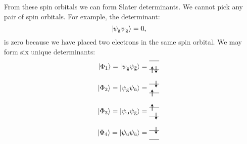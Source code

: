 \documentclass[../Main/chem532-notes.tex]{subfiles}
\begin{document}
From these spin orbitals we can form Slater determinants.
We cannot pick any pair of spin orbitals.
For example, the determinant:
\begin{equation}
\ket{\psi_{\mathrm{g}}\psi_{\mathrm{g}}} = 0,
\end{equation}
is zero because we have placed two electrons in the same spin orbital.
We may form six unique determinants:
\begin{align}
\ket{\Phi_1} = \ket{\psi_{\mathrm{g}}\psi_{\bar{\mathrm{g}}}} 
=
  \begin{tikzpicture}[baseline={([yshift=-.5ex]current bounding box.center)},vertex/.style={anchor=base, minimum size=18pt, inner sep=2pt}]
    \draw (0,0.275) -- (0.5,0.275);
    \draw (0,0.725) -- (0.5,0.725);
    \draw[thick,->,>=stealth] (0.15,0.1) -- (0.15,0.45);
    \draw[thick,<-,>=stealth] (0.35,0.1) -- (0.35,0.45);
  \end{tikzpicture}\\[6pt]
  \ket{\Phi_2} = \ket{\psi_{\mathrm{g}}\psi_{\bar{\mathrm{u}}}} 
=
  \begin{tikzpicture}[baseline={([yshift=-.5ex]current bounding box.center)},vertex/.style={anchor=base, minimum size=18pt, inner sep=2pt}]
    \draw (0,0.275) -- (0.5,0.275);
    \draw (0,0.725) -- (0.5,0.725);
    \draw[thick,->,>=stealth] (0.15,0.1) -- (0.15,0.45);
    \draw[thick,<-,>=stealth] (0.35,0.55) -- (0.35,0.9);
  \end{tikzpicture}\\[6pt]
  \ket{\Phi_3} = \ket{\psi_{\mathrm{u}}\psi_{\bar{\mathrm{g}}}} 
=
  \begin{tikzpicture}[baseline={([yshift=-.5ex]current bounding box.center)},vertex/.style={anchor=base, minimum size=18pt, inner sep=2pt}]
    \draw (0,0.275) -- (0.5,0.275);
    \draw (0,0.725) -- (0.5,0.725);
    \draw[thick,<-,>=stealth] (0.35,0.1) -- (0.35,0.45);
    \draw[thick,->,>=stealth] (0.15,0.55) -- (0.15,0.9);
  \end{tikzpicture}\\[6pt]
    \ket{\Phi_4} = \ket{\psi_{\mathrm{u}}\psi_{\bar{\mathrm{u}}}} 
=
  \begin{tikzpicture}[baseline={([yshift=-.5ex]current bounding box.center)},vertex/.style={anchor=base, minimum size=18pt, inner sep=2pt}]
    \draw (0,0.275) -- (0.5,0.275);
    \draw (0,0.725) -- (0.5,0.725);
    \draw[thick,<-,>=stealth] (0.35,0.55) -- (0.35,0.9);

\end{tikzpicture}
\end{align}
\end{document}
